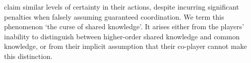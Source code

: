 \documentclass[10pt,letterpaper]{article}
\makeatletter
\newcommand{\re}[1]{{\color{brown} RE: #1}}
\newcommand{\tobo}[1]{{\color{red} TOBO: #1}}
\newcommand{\tsn}[1]{{\color{blue} TSN: #1}}
\newcommand{\add}[1]{{@@@Add: #1}}
\makeatother
\begin{document}
claim similar levels of certainty in their actions, %
despite incurring significant penalties when falsely assuming guaranteed coordination.
We term this phenomenon `the curse of shared knowledge'. It %
arises either from the players' %
inability to distinguish between higher-order shared knowledge and common knowledge, or from their implicit assumption that their co-player cannot make this distinction.
  
%
\end{document}
